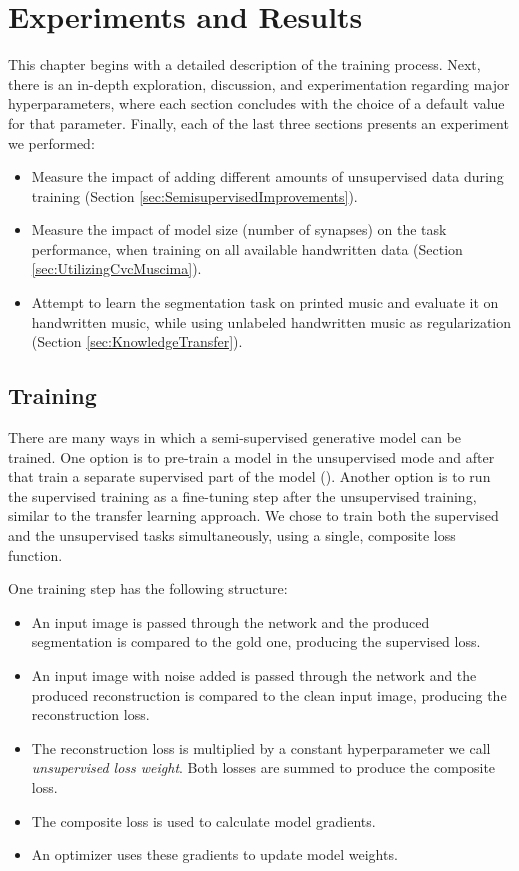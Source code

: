 \chapter{Experiments and Results}
\label{chap:ExperimentsAndResults}

This chapter begins with a detailed description of the training process. Next, there is an in-depth exploration, discussion, and experimentation regarding major hyperparameters, where each section concludes with the choice of a default value for that parameter. Finally, each of the last three sections presents an experiment we performed:

\begin{itemize}
    \item Measure the impact of adding different amounts of unsupervised data during training (Section \ref{sec:SemisupervisedImprovements}).
    \item Measure the impact of model size (number of synapses) on the task performance, when training on all available handwritten data (Section \ref{sec:UtilizingCvcMuscima}).
    \item Attempt to learn the segmentation task on printed music and evaluate it on handwritten music, while using unlabeled handwritten music as regularization (Section \ref{sec:KnowledgeTransfer}).
\end{itemize}


\section{Training}
\label{sec:Training}

There are many ways in which a semi-supervised generative model can be trained. One option is to pre-train a model in the unsupervised mode and after that train a separate supervised part of the model (\cite{KingmaSslVae}). Another option is to run the supervised training as a fine-tuning step after the unsupervised training, similar to the transfer learning approach. We chose to train both the supervised and the unsupervised tasks simultaneously, using a single, composite loss function.

One training step has the following structure:

\begin{itemize}
    \item An input image is passed through the network and the produced segmentation is compared to the gold one, producing the supervised loss.
    \item An input image with noise added is passed through the network and the produced reconstruction is compared to the clean input image, producing the reconstruction loss.
    \item The reconstruction loss is multiplied by a constant hyperparameter we call \emph{unsupervised loss weight}. Both losses are summed to produce the composite loss.
    \item The composite loss is used to calculate model gradients.
    \item An optimizer uses these gradients to update model weights.
\end{itemize}


